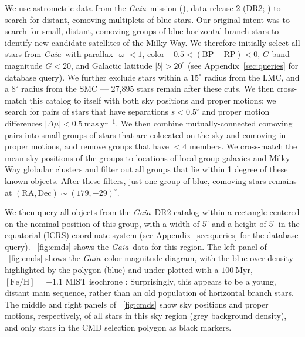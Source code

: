 \documentclass[twocolumn]{aastex62}
\newcommand{\acronym}[1]{{\small{#1}}}
\newcommand{\gaia}{\textsl{Gaia}}
\newcommand{\DR}[1]{\acronym{DR#1}}
\newcommand{\masyr}{\ensuremath{\textrm{mas}~\textrm{yr}^{-1}}}
\newcommand{\feh}{\ensuremath{[\textrm{Fe} / \textrm{H}]}}
\newcommand{\bprp}{\ensuremath{\textrm{BP} - \textrm{RP}}}
\begin{document}
We use astrometric data from the \gaia\ mission (\citealt{Prusti:2016}), data release 2 (\DR{2}; \citealt{Gaia-Collaboration:2018, Lindegren:2018}) to search for distant, comoving multiplets of blue stars.
Our original intent was to search for small, distant, comoving groups of blue horizontal branch stars to identify new candidate satellites of the Milky Way.
We therefore initially select all stars from \gaia\ with parallax $\varpi < 1$, color $-0.5 < (\bprp) < 0$, $G$-band magnitude $G < 20$, and Galactic latitude $|b| > 20^\circ$ (see Appendix~\ref{sec:queries} for database query).
We further exclude stars within a $15^\circ$ radius from the LMC, and a $8^\circ$ radius from the SMC --- 27,895 stars remain after these cuts.
We then cross-match this catalog to itself with both sky positions and proper motions: we search for pairs of stars that have separations $s < 0.5^\circ$ and proper motion differences $|\Delta \mu| < 0.5~\masyr$.
We then combine mutually-connected comoving pairs into small groups of stars that are colocated on the sky and comoving in proper motions, and remove groups that have $<4$ members.
We cross-match the mean sky positions of the groups to locations of local group galaxies \citep{McConnachie:2012} and Milky Way globular clusters \citep[2010 edition;][]{Harris:1996} and filter out all groups that lie within 1 degree of these known objects.
After these filters, just one group of blue, comoving stars remains at $(\textrm{RA}, \textrm{Dec}) \sim (179, -29)^\circ$.

We then query all objects from the \gaia\ \DR{2} catalog within a rectangle centered on the nominal position of this group, with a width of $5^\circ$ and a height of $5^\circ$ in the equatorial (ICRS) coordinate system (see Appendix~\ref{sec:queries} for the database query).
\figurename~\ref{fig:cmds} shows the \gaia\ data for this region.
The left panel of \figurename~\ref{fig:cmds} shows the \gaia\ color-magnitude diagram, with the blue over-density highlighted by the polygon (blue) and under-plotted with a $100~\textrm{Myr}$, $\feh = -1.1$ \acronym{MIST} isochrone \citep[red line;][]{Dotter:2016, Choi:2016, Paxton:2011, Paxton:2013, Paxton:2015}: Surprisingly, this appears to be a young, distant main sequence, rather than an old population of horizontal branch stars.
The middle and right panels of \figurename~\ref{fig:cmds} show sky positions and proper motions, respectively, of all stars in this sky region (grey background density), and only stars in the CMD selection polygon as black markers.
\end{document}
